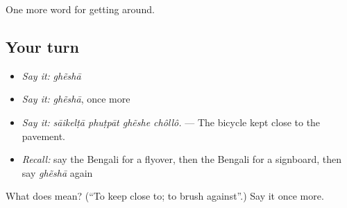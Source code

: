 \begin{grammarlens}[title={What you've built}]
One more word for getting around.
\end{grammarlens}

\subsection*{Your turn}
\begin{itemize}
\raggedright
  \item \emph{Say it:} \emph{ghẽshā}
  \item \emph{Say it:} \emph{ghẽshā}, once more
  \item \emph{Say it:} \emph{sāikelṭā phuṭpāt ghẽshe chôllô.} — The bicycle kept close to the pavement.
  \item \emph{Recall:} say the Bengali for a flyover, then the Bengali for a signboard, then say \emph{ghẽshā} again
\end{itemize}

\begin{tcolorbox}[breakable,colback=teal!4,colframe=teal!35!black,title={Before you move on}]
What does  mean? (\textquotedblleft{}To keep close to; to brush against\textquotedblright{}.) Say it once more.
\end{tcolorbox}
